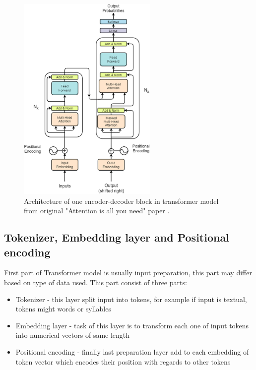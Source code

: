 \begin{figure}[!h]
	\centering
	
	\includegraphics[width=0.6\textwidth]{images/trans_arch.png}
	
	\caption{Architecture of one encoder-decoder block in transformer model from original "Attention is all you need" paper \cite{attentionAllYouNeed}.}
	\label{fig:trans}
\end{figure}

\subsection{Tokenizer, Embedding layer and Positional encoding}

First part of Transformer model is usually input preparation, this part may differ based on type of data used. This part consist of three parts:
\\

\begin{itemize}
	\item Tokenizer - this layer split input into tokens, for example if input is textual, tokens might words or syllables
	\item Embedding layer - task of this layer is to transform each one of input tokens into numerical vectors of same length
	\item Positional encoding - finally last preparation layer add to each embedding of token vector which encodes their position with regards to other tokens
\end{itemize}


